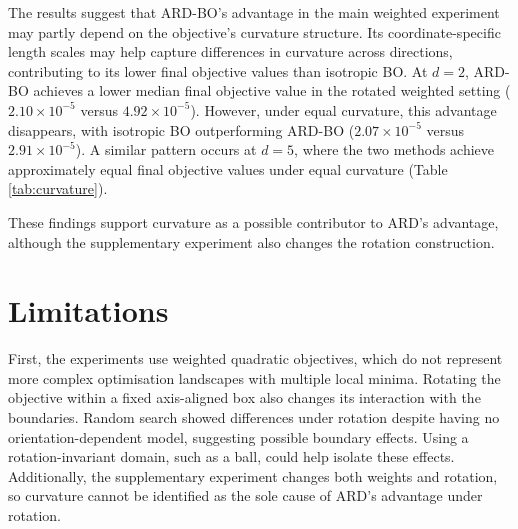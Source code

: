 \documentclass[11pt]{article}
\begin{document}
The results suggest that ARD-BO's advantage in the main weighted experiment may partly depend on the objective's curvature structure. Its coordinate-specific length scales may help capture differences in curvature across directions, contributing to its lower final objective values than isotropic BO. At $d = 2$, ARD-BO achieves a lower median final objective value in the rotated weighted setting ($2.10 \times 10^{-5}$ versus $4.92 \times 10^{-5}$). However, under equal curvature, this advantage disappears, with isotropic BO outperforming ARD-BO ($2.07 \times 10^{-5}$ versus $2.91 \times 10^{-5}$). A similar pattern occurs at $d = 5$, where the two methods achieve approximately equal final objective values under equal curvature (Table \ref{tab:curvature}).

\begin{table}[H]
\centering
\caption{Median final best values for ARD-BO and isotropic BO on weighted and equal-curvature objectives.}
\label{tab:curvature}
\end{table}

These findings support curvature as a possible contributor to ARD's advantage, although the supplementary experiment also changes the rotation construction.

\section{Limitations}

First, the experiments use weighted quadratic objectives, which do not represent more complex optimisation landscapes with multiple local minima. Rotating the objective within a fixed axis-aligned box also changes its interaction with the boundaries. Random search showed differences under rotation despite having no orientation-dependent model, suggesting possible boundary effects. Using a rotation-invariant domain, such as a ball, could help isolate these effects. Additionally, the supplementary experiment changes both weights and rotation, so curvature cannot be identified as the sole cause of ARD's advantage under rotation.
\end{document}
